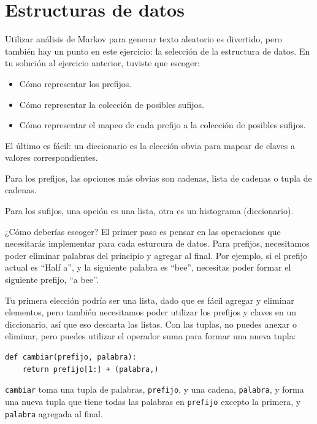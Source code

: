 \documentclass[10pt]{book}
\begin{document}
\section{Estructuras de datos}

Utilizar análisis de Markov para generar texto aleatorio es divertido, pero también
hay un punto en este ejercicio: la selección de la estructura de datos.  En tu
solución al ejercicio anterior, tuviste que escoger:

\begin{itemize}

\item Cómo representar los prefijos.

\item Cómo representar la colección de posibles sufijos.

\item Cómo representar el mapeo de cada prefijo a
la colección de posibles sufijos.

\end{itemize}

El último es fácil: un diccionario es la elección obvia
para mapear de claves a valores correspondientes.

Para los prefijos, las opciones más obvias son cadenas,
lista de cadenas o tupla de cadenas.

Para los sufijos,
una opción es una lista, otra es un histograma (diccionario).

¿Cómo deberías escoger?  El primer paso es pensar en
las operaciones que necesitarás implementar para cada esturcura de datos.
Para prefijos, necesitamos poder eliminar palabras del
principio y agregar al final.  Por ejemplo, si el prefijo actual
es ``Half a'', y la siguiente palabra es ``bee'', necesitas
poder formar el siguiente prefijo, ``a bee''.

Tu primera elección podría ser una lista, dado que es fácil agregar y
eliminar elementos, pero también necesitamos poder utilizar los
prefijos y claves en un diccionario, así que eso descarta las listas.
Con las tuplas, no puedes anexar o eliminar, pero puedes utilizar
el operador suma para formar una nueva tupla:

\begin{verbatim}
def cambiar(prefijo, palabra):
    return prefijo[1:] + (palabra,)
\end{verbatim}
%
{\tt cambiar} toma una tupla de palabras, {\tt prefijo}, y una cadena,
{\tt palabra}, y forma una nueva tupla que tiene todas las palabras
en {\tt prefijo} excepto la primera, y {\tt palabra} agregada al
final.
\end{document}
